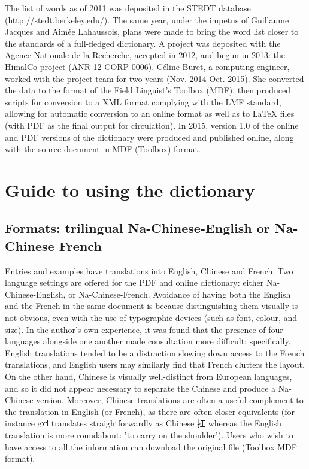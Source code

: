 \documentclass[oldfontcommands,oneside,a4paper,11pt]{article}
\newcommand{\ipa}[1]{{\phon #1}} %
\newcommand{\zh}[1]{{\cn #1}}
\begin{document}
	The list of words as of 2011 was deposited in the STEDT database (http://stedt.berkeley.edu/). The same year, under the impetus of Guillaume Jacques and Aimée Lahaussois, plans were made to bring the word list closer to the standards of a full-fledged dictionary. A project was deposited with the Agence Nationale de la Recherche, accepted in 2012, and begun in 2013: the HimalCo project (ANR-12-CORP-0006). Céline Buret, a computing engineer, worked with the project team for two years (Nov. 2014-Oct. 2015). She converted the data to the format of the Field Linguist's Toolbox (MDF), then produced scripts for conversion to a XML format complying with the LMF standard, allowing for automatic conversion to an online format as well as to LaTeX files (with PDF as the final output for circulation). In 2015, version 1.0 of the online and PDF versions of the dictionary were produced and published online, along with the source document in MDF (Toolbox) format.
	
	\section{Guide to using the dictionary} \label{sec:howto}
	
	\subsection{Formats: trilingual Na-Chinese-English or Na-Chinese French} \label{sec:versions}
	
	Entries and examples have translations into English, Chinese and French. Two language settings are offered for the PDF and online dictionary: either Na-Chinese-English, or Na-Chinese-French. Avoidance of having both the English and the French in the same document is because distinguishing them visually is not obvious, even with the use of typographic devices (such as font, colour, and size). In the author's own experience, it was found that the presence of four languages alongside one another made consultation more difficult; specifically, English translations tended to be a distraction slowing down access to the French translations, and English users may similarly find that French clutters the layout. On the other hand, Chinese is visually well-distinct from European languages, and so it did not appear necessary to separate the Chinese and produce a Na-Chinese version. Moreover, Chinese translations are often a useful complement to the translation in English (or French), as there are often closer equivalents (for instance \ipa{gɤ˧˥} translates straightforwardly as Chinese \zh{扛} whereas the English translation is more roundabout: 'to carry on the shoulder'). Users who wish to have access to all the information can download the original file (Toolbox MDF format). 
	
\end{document}
